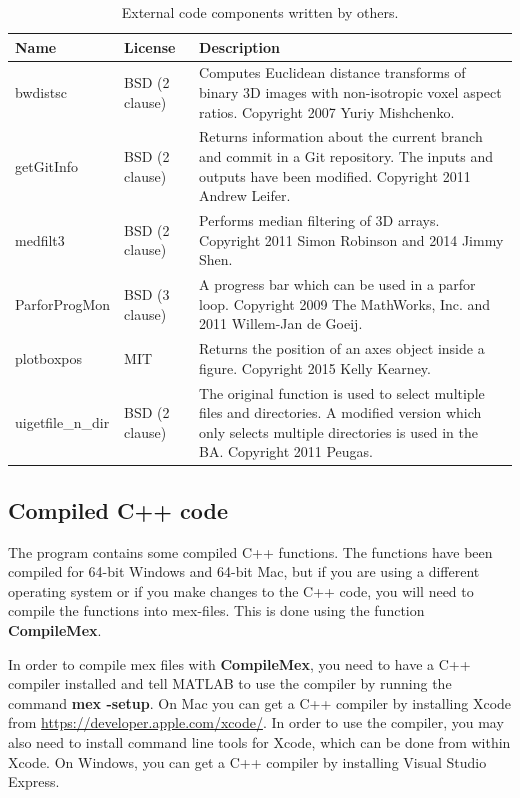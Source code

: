 \documentclass[a4paper, oneside, onecolumn, 11pt]{article}
\newcommand{\command}[1]{\textbf{#1}}
\begin{document}
\begin{table}[!htbp]
\caption{External code components written by others.}
\label{tab:external}
\begin{tabularx}{\textwidth}{llX}
Name & License & Description\\
\hline
bwdistsc & BSD (2 clause) & Computes Euclidean distance transforms of binary 3D images with non-isotropic voxel aspect ratios. Copyright 2007 Yuriy Mishchenko.\\
getGitInfo & BSD (2 clause)  & Returns information about the current branch and commit in a Git repository. The inputs and outputs have been modified.  Copyright 2011 Andrew Leifer.\\
medfilt3 & BSD (2 clause) & Performs median filtering of 3D arrays. Copyright 2011 Simon Robinson and 2014 Jimmy Shen.\\
ParforProgMon & BSD (3 clause) & A progress bar which can be used in a parfor loop. Copyright 2009 The MathWorks, Inc. and 2011 Willem-Jan de Goeij.\\
plotboxpos & MIT & Returns the position of an axes object inside a figure. Copyright 2015 Kelly Kearney.\\
uigetfile\_n\_dir & BSD (2 clause) & The original function is used to select multiple files and directories. A modified version which only selects multiple directories is used in the BA. Copyright 2011 Peugas.\\
\end{tabularx}
\end{table}

\subsection{Compiled C++ code}
\label{sec:compile}
The program contains some compiled C++ functions. The functions have been compiled for 64-bit Windows and 64-bit Mac, but if you are using a different operating system or if you make changes to the C++ code, you will need to compile the functions into mex-files. This is done using the function \command{CompileMex}.

In order to compile mex files with \command{CompileMex}, you need to have a C++ compiler installed and tell MATLAB to use the compiler by running the command \command{mex -setup}. On Mac you can get a C++ compiler by installing Xcode from \url{https://developer.apple.com/xcode/}. In order to use the compiler, you may also need to install command line tools for Xcode, which can be done from within Xcode. On Windows, you can get a C++ compiler by installing Visual Studio Express.
\end{document}

